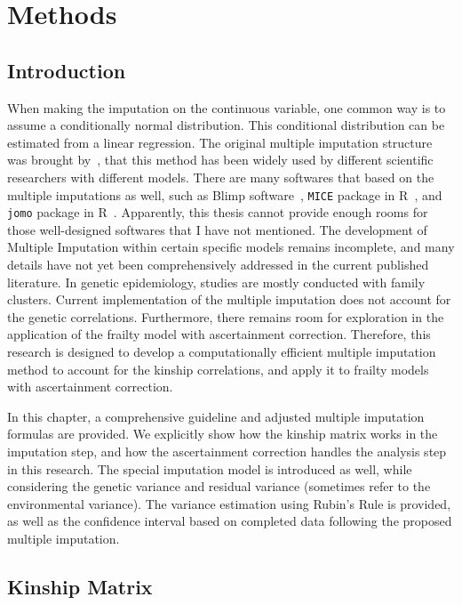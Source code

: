 \chapter{Methods}
\section{Introduction}
When making the imputation on the continuous variable, one common way is to assume a conditionally normal distribution. 
This conditional distribution can be estimated from a linear regression. 
The original multiple imputation structure was brought by~\citet{rubin1987multiple}, that this method has been widely used by different scientific researchers with different models.
There are many softwares that based on the multiple imputations as well, such as Blimp software~\cite{keller2021blimp}, \texttt{MICE} package in R~\cite{royston2011multiple}, and \texttt{jomo} package in R~\cite{quartagno2019jomo}. 
Apparently, this thesis cannot provide enough rooms for those well-designed softwares that I have not mentioned. 
The development of Multiple Imputation within certain specific models remains incomplete, and many details have not yet been comprehensively addressed in the current published literature.
In genetic epidemiology, studies are mostly conducted with family clusters. 
Current implementation of the multiple imputation does not account for the genetic correlations. 
Furthermore, there remains room for exploration in the application of the frailty model with ascertainment correction.
Therefore, this research is designed to develop a computationally efficient multiple imputation method to account for the kinship correlations, and apply it to frailty models with ascertainment correction. 

In this chapter, a comprehensive guideline and adjusted multiple imputation formulas are provided. 
We explicitly show how the kinship matrix works in the imputation step, and how the ascertainment correction handles the analysis step in this research. 
The special imputation model is introduced as well, while considering the genetic variance and residual variance (sometimes refer to the environmental variance).
The variance estimation using Rubin's Rule is provided, as well as the confidence interval based on completed data following the proposed multiple imputation.

\section{Kinship Matrix}
